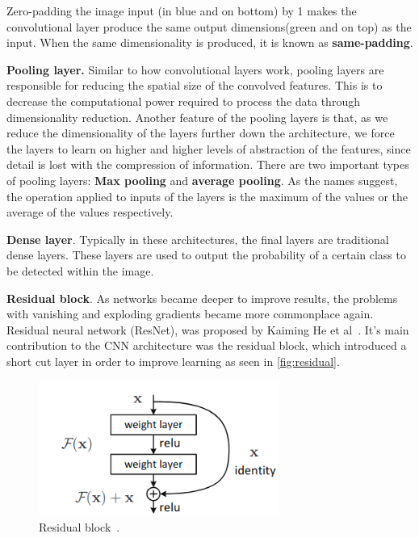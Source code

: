 \documentclass[english, bibtex]{kththesis}
\begin{document}
\begin{center}
Zero-padding the image input (in blue and on bottom) by 1 makes the convolutional layer produce the same output dimensions(green and on top) as the input. When the same dimensionality is produced, it is known as \textbf{same-padding}.
\end{center}

\textbf{Pooling layer.} Similar to how convolutional layers work, pooling layers are responsible for reducing the spatial size of the convolved features. This is to decrease the computational power required to process the data through dimensionality reduction. Another feature of the pooling layers is that, as we reduce the dimensionality of the layers further down the architecture, we force the layers to learn on higher and higher levels of abstraction of the features, since detail is lost with the compression of information. There are two important types of pooling layers: \textbf{Max pooling} and \textbf{average pooling}. As the names suggest, the operation applied to inputs of the layers is the maximum of the values or the average of the values respectively. 

\textbf{Dense layer}. Typically in these architectures, the final layers are traditional dense layers. These layers are used to output the probability of a certain class to be detected within the image. 

\textbf{Residual block}. As networks became deeper to improve results, the problems with vanishing and exploding gradients became more commonplace again. Residual neural network (ResNet), was proposed by Kaiming He et al~\cite{he2016deep}. It’s main contribution to the CNN architecture was the residual block, which introduced a short cut layer in order to improve learning as seen in \autoref{fig:residual}. 

\begin{figure}[H]
  \begin{center}
    \includegraphics[width=0.7\textwidth]{figures/residual_block.png}
  \end{center}
  \caption{Residual block~\cite{he2016deep}.}
  \label{fig:residual}
\end{figure}
\end{document}
